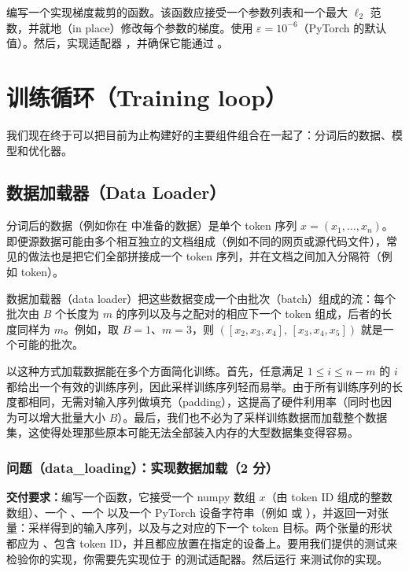 编写一个实现梯度裁剪的函数。该函数应接受一个参数列表和一个最大 $\ell_2$ 范数，并就地（in place）修改每个参数的梯度。使用 $\varepsilon = 10^{-6}$（PyTorch 的默认值）。然后，实现适配器 ，并确保它能通过 。

\section{训练循环（Training loop）}

我们现在终于可以把目前为止构建好的主要组件组合在一起了：分词后的数据、模型和优化器。

\subsection{数据加载器（Data Loader）}

分词后的数据（例如你在  中准备的数据）是单个 token 序列 $x = (x_1, \ldots, x_n)$。即便源数据可能由多个相互独立的文档组成（例如不同的网页或源代码文件），常见的做法也是把它们全部拼接成一个 token 序列，并在文档之间加入分隔符（例如  token）。

数据加载器（data loader）把这些数据变成一个由批次（batch）组成的流：每个批次由 $B$ 个长度为 $m$ 的序列以及与之配对的相应下一个 token 组成，后者的长度同样为 $m$。例如，取 $B = 1$、$m = 3$，则 $([x_2, x_3, x_4],\, [x_3, x_4, x_5])$ 就是一个可能的批次。

以这种方式加载数据能在多个方面简化训练。首先，任意满足 $1 \le i \le n - m$ 的 $i$ 都给出一个有效的训练序列，因此采样训练序列轻而易举。由于所有训练序列的长度都相同，无需对输入序列做填充（padding），这提高了硬件利用率（同时也因为可以增大批量大小 $B$）。最后，我们也不必为了采样训练数据而加载整个数据集，这使得处理那些原本可能无法全部装入内存的大型数据集变得容易。

\subsubsection*{问题（data\_loading）：实现数据加载（2 分）}

\textbf{交付要求：}编写一个函数，它接受一个 numpy 数组 $x$（由 token ID 组成的整数数组）、一个 、一个  以及一个 PyTorch 设备字符串（例如  或 ），并返回一对张量：采样得到的输入序列，以及与之对应的下一个 token 目标。两个张量的形状都应为 、包含 token ID，并且都应放置在指定的设备上。要用我们提供的测试来检验你的实现，你需要先实现位于  的测试适配器。然后运行  来测试你的实现。

